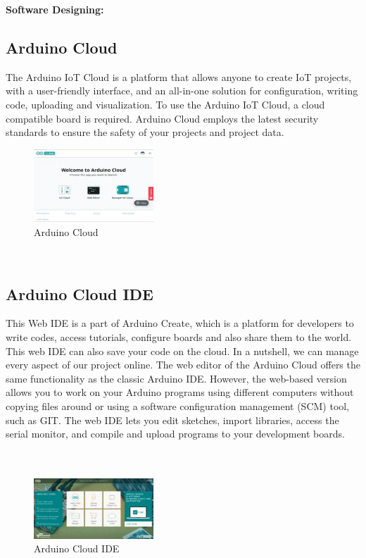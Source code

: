\documentclass[conference]{IEEEtran}
\begin{document}
\textbf{Software Designing:\\}

\subsection{Arduino Cloud}\label{AA}

The Arduino IoT Cloud is a platform that allows anyone to create IoT projects, with a user-friendly interface, and an all-in-one solution for configuration, writing code, uploading and visualization. To use the Arduino IoT Cloud, a cloud compatible board is required. Arduino Cloud employs the latest security standards to ensure the safety of your projects and project data.
\begin{figure}[htbp]
\centerline{\includegraphics[width=0.4\textwidth]{Picture1.png}}
\caption{Arduino Cloud}
\label{fig}
\end{figure}
\\

\subsection{Arduino Cloud IDE}\label{AA}
This Web IDE is a part of Arduino Create, which is a platform for developers to write codes, access tutorials, configure boards and also share them to the world. This web IDE can also save your code on the cloud. In a nutshell, we can manage every aspect of our project online. The web editor of the Arduino Cloud offers the same functionality as the classic Arduino IDE. However, the web-based version allows you to work on your Arduino programs using different computers without copying files around or using a software configuration management (SCM) tool, such as GIT. The web IDE lets you edit sketches, import libraries, access the serial monitor, and compile and upload programs to your development boards.
\\\\\\
\begin{figure}[htbp]
\centerline{\includegraphics[width=0.4\textwidth]{Picture2.png}}
\caption{Arduino Cloud IDE}
\label{fig}
\end{figure}
\end{document}
